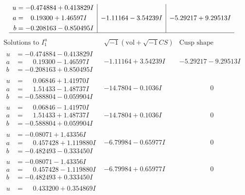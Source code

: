 \documentclass[1p]{elsarticle_modified}
\theoremstyle{definition}
\newcommand{\I}{\sqrt{-1}}
\begin{document}
$$\begin{array}{c|c|c}
\begin{aligned}
u &= -0.474884 + 0.413829 I \\
a &= \phantom{-}0.19300 + 1.46597 I \\
b &= -0.208163 - 0.850495 I\end{aligned}
 & -1.11164 - 3.54239 I & -5.29217 + 9.29513 I\\
 \hline 
 \end{array}$$\newpage$$\begin{array}{c|c|c}  
\text{Solutions to }I^u_{1}& \I (\text{vol} + \sqrt{-1}CS) & \text{Cusp shape}\\
 \hline 
\begin{aligned}
u &= -0.474884 - 0.413829 I \\
a &= \phantom{-}0.19300 - 1.46597 I \\
b &= -0.208163 + 0.850495 I\end{aligned}
 & -1.11164 + 3.54239 I & -5.29217 - 9.29513 I \\ \hline\begin{aligned}
u &= \phantom{-}0.06846 + 1.41970 I \\
a &= \phantom{-}1.51433 - 1.48737 I \\
b &= -0.588804 - 0.059904 I\end{aligned}
 & -14.7804 - 0.1036 I & \phantom{-0.000000 } 0 \\ \hline\begin{aligned}
u &= \phantom{-}0.06846 - 1.41970 I \\
a &= \phantom{-}1.51433 + 1.48737 I \\
b &= -0.588804 + 0.059904 I\end{aligned}
 & -14.7804 + 0.1036 I & \phantom{-0.000000 } 0 \\ \hline\begin{aligned}
u &= -0.08071 + 1.43356 I \\
a &= \phantom{-}0.457428 + 1.119880 I \\
b &= -0.482493 - 0.333450 I\end{aligned}
 & -6.79984 - 0.65977 I & \phantom{-0.000000 } 0 \\ \hline\begin{aligned}
u &= -0.08071 - 1.43356 I \\
a &= \phantom{-}0.457428 - 1.119880 I \\
b &= -0.482493 + 0.333450 I\end{aligned}
 & -6.79984 + 0.65977 I & \phantom{-0.000000 } 0 \\ \hline\begin{aligned}
u &= \phantom{-}0.433200 + 0.354869 I \\

\end{aligned}
\end{array}$$
\end{document}
